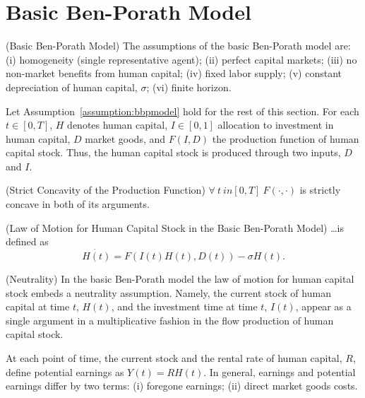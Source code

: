 \section{Basic Ben-Porath Model} \label{section:baseline}
\begin{assumption} (Basic Ben-Porath Model) \label{assumption:bbpmodel}
The assumptions of the basic Ben-Porath model are: (i) homogeneity (single representative agent); (ii) perfect capital markets; (iii) no non-market benefits from human capital; (iv) fixed labor supply; (v) constant depreciation of human capital, $\sigma$; (vi) finite horizon.
\end{assumption}

\noindent Let Assumption~\ref{assumption:bbpmodel} hold for the rest of this section. For each $t \in [0,T]$, $H$ denotes human capital, $I \in [0,1]$ allocation to investment in human capital, $D$ market goods, and $F(I,D)$ the production function of human capital stock. Thus, the human capital stock is produced through two inputs, $D$ and $I$. 

\begin{assumption} (Strict Concavity of the Production Function) \label{assumption:scpf}  $\forall \ t \ in [0,T] \ F(\cdot, \cdot)$ is strictly concave in both of its arguments.
\end{assumption}

\begin{definition} (Law of Motion for Human Capital Stock in the Basic Ben-Porath Model)
\ldots is defined as
\begin{equation}
\dot{H(t)} = F \left( I(t) H(t), D(t) \right) - \sigma H(t). \label{eq:lawh}
\end{equation}
\end{definition}

\begin{remark} (Neutrality)
In the basic Ben-Porath model the law of motion for human capital stock embeds a neutrality assumption. Namely, the current stock of human capital at time $t$, $H(t)$, and the investment time at time $t$, $I(t)$, appear as a single argument in a multiplicative fashion in the flow production of human capital stock. 
\end{remark}

\indent At each point of time, the current stock and the rental rate of human capital, $R$, define potential earnings as $Y(t) = R H(t)$. In general, earnings and potential earnings differ by two terms: (i) foregone earnings; (ii) direct market goods costs. 

